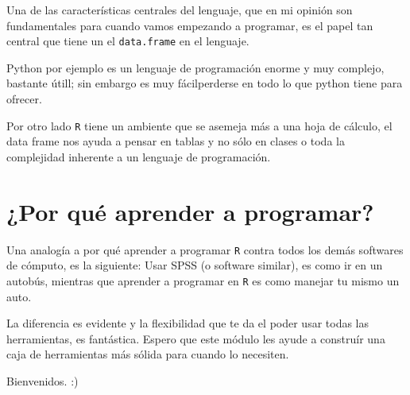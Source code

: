 \documentclass[
]{article}
\begin{document}
Una de las características centrales del lenguaje, que en mi opinión son
fundamentales para cuando vamos empezando a programar, es el papel tan
central que tiene un el \texttt{data.frame} en el lenguaje.

Python por ejemplo es un lenguaje de programación enorme y muy complejo,
bastante útill; sin embargo es muy fácilperderse en todo lo que python
tiene para ofrecer.

Por otro lado \texttt{R} tiene un ambiente que se asemeja más a una hoja
de cálculo, el data frame nos ayuda a pensar en tablas y no sólo en
clases o toda la complejidad inherente a un lenguaje de programación.

\hypertarget{por-quuxe9-aprender-a-programar}{%
\section{¿Por qué aprender a
programar?}\label{por-quuxe9-aprender-a-programar}}

Una analogía a por qué aprender a programar \texttt{R} contra todos los
demás softwares de cómputo, es la siguiente: Usar SPSS (o software
similar), es como ir en un autobús, mientras que aprender a programar en
\texttt{R} es como manejar tu mismo un auto.

La diferencia es evidente y la flexibilidad que te da el poder usar
todas las herramientas, es fantástica. Espero que este módulo les ayude
a construír una caja de herramientas más sólida para cuando lo
necesiten.

Bienvenidos. :)
\end{document}
